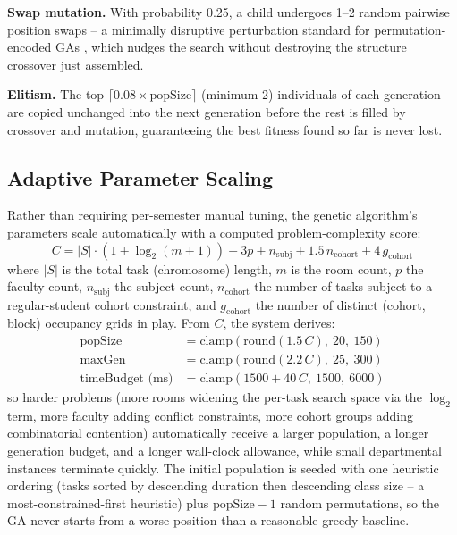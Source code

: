 \documentclass[conference]{IEEEtran}
\begin{document}
\textbf{Swap mutation.} With probability 0.25, a child undergoes 1--2 random pairwise position swaps -- a minimally disruptive perturbation standard for permutation-encoded GAs \cite{cicirello2023}, which nudges the search without destroying the structure crossover just assembled.

\textbf{Elitism.} The top $\lceil 0.08 \times \text{popSize} \rceil$ (minimum 2) individuals of each generation are copied unchanged into the next generation before the rest is filled by crossover and mutation, guaranteeing the best fitness found so far is never lost.

\subsection{Adaptive Parameter Scaling}
Rather than requiring per-semester manual tuning, the genetic algorithm's parameters scale automatically with a computed problem-complexity score:
\begin{equation}
C = |S| \cdot (1 + \log_2(m+1)) + 3p + n_{\text{subj}} + 1.5\,n_{\text{cohort}} + 4\,g_{\text{cohort}}
\label{eq:complexity}
\end{equation}
where $|S|$ is the total task (chromosome) length, $m$ is the room count, $p$ the faculty count, $n_{\text{subj}}$ the subject count, $n_{\text{cohort}}$ the number of tasks subject to a regular-student cohort constraint, and $g_{\text{cohort}}$ the number of distinct (cohort, block) occupancy grids in play. From $C$, the system derives:
\begin{align}
\text{popSize} &= \text{clamp}(\text{round}(1.5\,C),\ 20,\ 150) \\
\text{maxGen} &= \text{clamp}(\text{round}(2.2\,C),\ 25,\ 300) \\
\text{timeBudget (ms)} &= \text{clamp}(1500 + 40\,C,\ 1500,\ 6000)
\end{align}
so harder problems (more rooms widening the per-task search space via the $\log_2$ term, more faculty adding conflict constraints, more cohort groups adding combinatorial contention) automatically receive a larger population, a longer generation budget, and a longer wall-clock allowance, while small departmental instances terminate quickly. The initial population is seeded with one heuristic ordering (tasks sorted by descending duration then descending class size -- a most-constrained-first heuristic) plus $\text{popSize}{-}1$ random permutations, so the GA never starts from a worse position than a reasonable greedy baseline.
\end{document}
